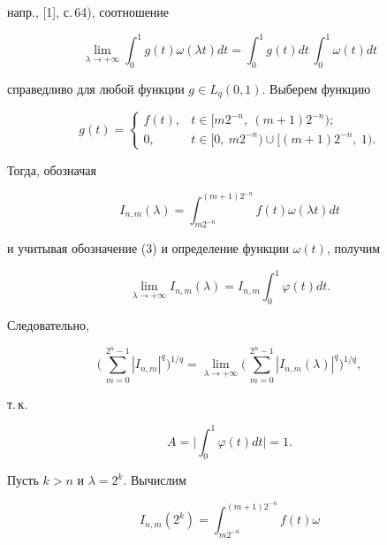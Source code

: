 \begin{pf}
напр., [1], с.\,64), соотношение 


$$ 


\lim_{\lambda\to+\infty}\int^1_0 g(t)\omega(\lambda t)dt= 


\int^1_0 g(t)dt\,\int^1_0\omega(t)dt 


$$ 


справедливо для любой функции $g\in L_q(0,1)$. Выберем функцию 


$$ 


g(t)= 


\begin{cases} 


f(t),& t\in[m2^{-n},\ (m+1)2^{-n});\\ 


0, & t\in[0,\ m2^{-n})\cup[(m+1)2^{-n},\ 1). 


\end{cases} 


$$ 


Тогда, обозначая 


$$ 


I_{n,m}(\lambda)=\int^{(m+1)2^{-n}}_{m2^{-n}} 


f(t)\omega(\lambda t)dt 


$$ 


и учитывая обозначение (3) и определение функции $\omega(t)$, получим 


$$ 


\lim_{\lambda\to+\infty}I_{n,m}(\lambda)= 


I_{n,m}\int^1_0\varphi(t)dt. 


$$ 


Следовательно, 


\begin{equation} 


\bigg(\,\sum^{2^n-1}_{m=0}|I_{n,m}|^q\bigg)^{1/q}= 


\lim_{\lambda\to+\infty}\bigg(\, 


\sum^{2^n-1}_{m=0}|I_{n,m}(\lambda)|^q\bigg)^{1/q}, 


\end{equation} 


т.\,к.


$$ 


A=\bigg|\int^1_0\varphi(t)dt\bigg|=1. 


$$ 


Пусть $k>n$ и $\lambda=2^k$. Вычислим 


\begin{equation} 


I_{n,m}(2^k)=\int^{(m+1)2^{-n}}_{m2^{-n}}f(t)\omega 



\end{equation}
\end{pf}
